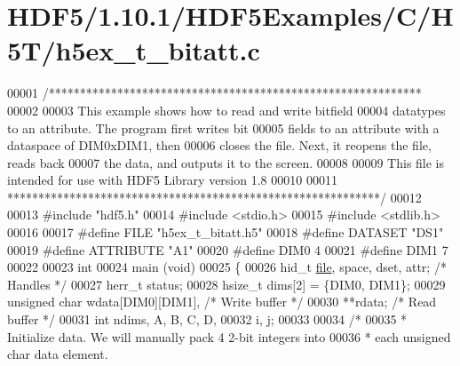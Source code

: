\hypertarget{_h_d_f5_21_810_81_2_h_d_f5_examples_2_c_2_h5_t_2h5ex__t__bitatt_8c_source}{}\section{H\+D\+F5/1.10.1/\+H\+D\+F5\+Examples/\+C/\+H5\+T/h5ex\+\_\+t\+\_\+bitatt.c}
\label{_h_d_f5_21_810_81_2_h_d_f5_examples_2_c_2_h5_t_2h5ex__t__bitatt_8c_source}

\begin{DoxyCode}
00001 \textcolor{comment}{/************************************************************}
00002 \textcolor{comment}{}
00003 \textcolor{comment}{  This example shows how to read and write bitfield}
00004 \textcolor{comment}{  datatypes to an attribute.  The program first writes bit}
00005 \textcolor{comment}{  fields to an attribute with a dataspace of DIM0xDIM1, then}
00006 \textcolor{comment}{  closes the file.  Next, it reopens the file, reads back}
00007 \textcolor{comment}{  the data, and outputs it to the screen.}
00008 \textcolor{comment}{}
00009 \textcolor{comment}{  This file is intended for use with HDF5 Library version 1.8}
00010 \textcolor{comment}{}
00011 \textcolor{comment}{ ************************************************************/}
00012 
00013 \textcolor{preprocessor}{#include "hdf5.h"}
00014 \textcolor{preprocessor}{#include <stdio.h>}
00015 \textcolor{preprocessor}{#include <stdlib.h>}
00016 
00017 \textcolor{preprocessor}{#define FILE            "h5ex\_t\_bitatt.h5"}
00018 \textcolor{preprocessor}{#define DATASET         "DS1"}
00019 \textcolor{preprocessor}{#define ATTRIBUTE       "A1"}
00020 \textcolor{preprocessor}{#define DIM0            4}
00021 \textcolor{preprocessor}{#define DIM1            7}
00022 
00023 \textcolor{keywordtype}{int}
00024 main (\textcolor{keywordtype}{void})
00025 \{
00026     hid\_t           \hyperlink{structfile}{file}, space, dset, attr;    \textcolor{comment}{/* Handles */}
00027     herr\_t          status;
00028     hsize\_t         dims[2] = \{DIM0, DIM1\};
00029     \textcolor{keywordtype}{unsigned} \textcolor{keywordtype}{char}   wdata[DIM0][DIM1],          \textcolor{comment}{/* Write buffer */}
00030                     **rdata;                    \textcolor{comment}{/* Read buffer */}
00031     \textcolor{keywordtype}{int}             ndims, A, B, C, D,
00032                     i, j;
00033 
00034     \textcolor{comment}{/*}
00035 \textcolor{comment}{     * Initialize data.  We will manually pack 4 2-bit integers into}
00036 \textcolor{comment}{     * each unsigned char data element.}

\end{DoxyCode}
